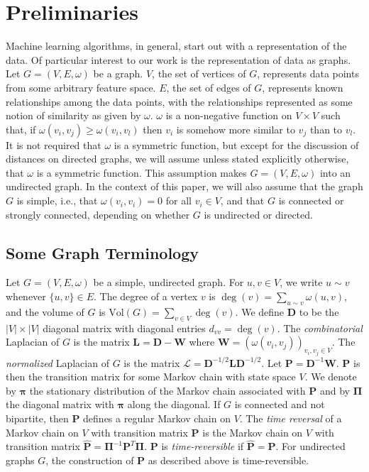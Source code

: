 \documentclass[10pt,twocolumn]{article}
\numberwithin{equation}{section}
\begin{document}
\section{Preliminaries}
Machine learning algorithms, in general, start out with a
representation of the data. Of particular interest to our work is the
representation of data as graphs. Let $G = (V,E,\omega)$ be a
graph. $V$, the set of vertices of $G$, represents data points from
some arbitrary feature space. $E$, the set of edges of $G$, represents
known relationships among the data points, with the relationships
represented as some notion of similarity as given by
$\omega$. $\omega$ is a non-negative function on $V \times V$ such
that, if $\omega(v_i, v_j) \geq \omega(v_i,v_l)$ then $v_i$ is somehow
more similar to $v_j$ than to $v_l$. It is not required that $\omega$
is a symmetric function, but except for the discussion of distances on
directed graphs, we will assume unless stated explicitly otherwise,
that $\omega$ is a symmetric function. This assumption makes $G =
(V,E,\omega)$ into an undirected graph. In the context of this paper,
we will also assume that the graph $G$ is simple, i.e., that
$\omega(v_i,v_i) = 0$ for all $v_i \in V$, and that $G$ is connected
or strongly connected, depending on whether $G$ is undirected or
directed.

\subsection{Some Graph Terminology}
\label{sec:some-graphs-term}
Let $G = (V,E,\omega)$ be a simple, undirected graph. For $u,v \in V$,
we write $u \sim v$ whenever $\{u,v\} \in E$. The degree of a vertex
$v$ is $\deg(v) = \sum_{u \sim v}{\omega(u,v)}$, and the volume of $G$
is $\mathrm{Vol}(G) = \sum_{v \in V}{\deg(v)}$. We define $\mathbf{D}$
to be the $|V| \times |V|$ diagonal matrix with diagonal entries
$d_{vv} = \deg(v)$. The {\em combinatorial} Laplacian of $G$ is the
matrix $\mathbf{L} = \mathbf{D} - \mathbf{W}$ where $\mathbf{W} =
(\omega(v_i,v_j))_{v_i,v_j \in V}$. The {\em normalized} Laplacian of
$G$ is the matrix $\mathbf{\mathcal{L}} = \mathbf{D}^{-1/2} \mathbf{L}
\mathbf{D}^{-1/2}$. Let $\mathbf{P} =
\mathbf{D}^{-1}\mathbf{W}$. $\mathbf{P}$ is then the transition matrix
for some Markov chain with state space $V$. We denote by $\bm{\pi}$
the stationary distribution of the Markov chain associated with
$\mathbf{P}$ and by $\bm{\Pi}$ the diagonal matrix with $\bm{\pi}$
along the diagonal. If $G$ is connected and not bipartite, then
$\mathbf{P}$ defines a regular Markov chain on $V$. The {\em time
  reversal} of a Markov chain on $V$ with transition matrix
$\mathbf{P}$ is the Markov chain on $V$ with transition matrix
$\hat{\mathbf{P}} = \bm{\Pi}^{-1} \mathbf{P}^{T}
\bm{\Pi}$. $\mathbf{P}$ is {\em time-reversible} if $\hat{\mathbf{P}}
= \mathbf{P}$. For undirected graphs $G$, the construction of
$\mathbf{P}$ as described above is time-reversible.
\end{document}
